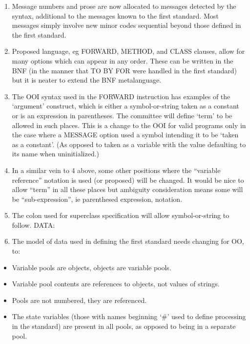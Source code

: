 \begin{enumerate}
\def\labelenumi{\arabic{enumi}.}
\setcounter{enumi}{1}
\item
  Message numbers and prose are now allocated to messages detected by
  the syntax, additional to the messages known to the first standard.
  Most messages simply involve new minor codes sequential beyond those
  defined in the first standard.
\item
  Proposed language, eg FORWARD, METHOD, and CLASS clauses, allow for
  many options which can appear in any order. These can be written in
  the BNF (in the manner that TO BY FOR were handled in the first
  standard) but it is neater to extend the BNF metalanguage.
\item
  The OOI syntax used in the FORWARD instruction has examples of the
  `argument' construct, which is either a symbol-or-string taken as a
  constant or is an expression in parentheses. The committee will define
  `term' to be allowed in such places. This is a change to the OOI for
  valid programs only in the case where a MESSAGE option used a symbol
  intending it to be `taken as a constant'. (As opposed to taken as a
  variable with the value defaulting to its name when uninitialized.)
\item
  In a similar vein to 4 above, some other positions where the
  ``variable reference'' notation is used (or proposed) will be changed.
  It would be nice to allow ``term'' in all these places but ambiguity
  consideration means some will be ``sub-expression'', ie parenthesed
  expression, notation.
\item
  The colon used for superclass specification will allow
  symbol-or-string to follow. DATA:
\item
  The model of data used in defining the first standard needs changing
  for OO, to:
\end{enumerate}

\begin{itemize}
\item
  Variable pools are objects, objects are variable pools.
\item
  Variable pool contents are references to objects, not values of
  strings.
\item
  Pools are not numbered, they are referenced.
\item
  The state variables (those with names beginning `\#' used to define
  processing in the standard) are present in all pools, as opposed to
  being in a separate pool.
\end{itemize}


